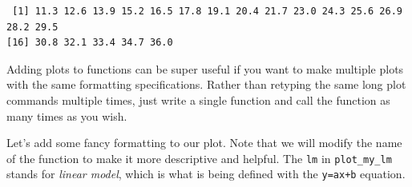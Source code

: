 \documentclass[
]{book}
\begin{document}
\begin{verbatim}
 [1] 11.3 12.6 13.9 15.2 16.5 17.8 19.1 20.4 21.7 23.0 24.3 25.6 26.9 28.2 29.5
[16] 30.8 32.1 33.4 34.7 36.0
\end{verbatim}

Adding plots to functions can be super useful if you want to make multiple plots with the same formatting specifications. Rather than retyping the same long plot commands multiple times, just write a single function and call the function as many times as you wish.

Let's add some fancy formatting to our plot. Note that we will modify the name of the function to make it more descriptive and helpful. The \texttt{lm} in \texttt{plot\_my\_lm} stands for \emph{linear model}, which is what is being defined with the \texttt{y=ax+b} equation.
\end{document}
